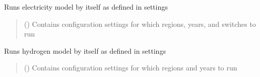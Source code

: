 \documentclass[letterpaper,10pt,english]{sphinxmanual}
\begin{document}
\begin{fulllineitems}
\label{\detokenize{src.integrator.runner:src.integrator.runner.run_elec_solo}}
\pysigstartsignatures
\pysiglinewithargsret
{}
{}
{}
\pysigstopsignatures
\sphinxAtStartPar
Runs electricity model by itself as defined in settings
\begin{quote}\begin{description}
\sphinxAtStartPar
{} ({\hyperref[\detokenize{src.common.config_setup:src.common.config_setup.Config_settings}]{}}) \textendash{} Contains configuration settings for which regions, years, and switches to run

\end{description}\end{quote}

\end{fulllineitems}


\begin{fulllineitems}
\label{\detokenize{src.integrator.runner:src.integrator.runner.run_h2_solo}}
\pysigstartsignatures
\pysiglinewithargsret
{}
{}
{}
\pysigstopsignatures
\sphinxAtStartPar
Runs hydrogen model by itself as defined in settings
\begin{quote}\begin{description}
\sphinxAtStartPar
{} ({\hyperref[\detokenize{src.common.config_setup:src.common.config_setup.Config_settings}]{}}) \textendash{} Contains configuration settings for which regions and years to run

\end{description}\end{quote}

\end{fulllineitems}
\end{document}
